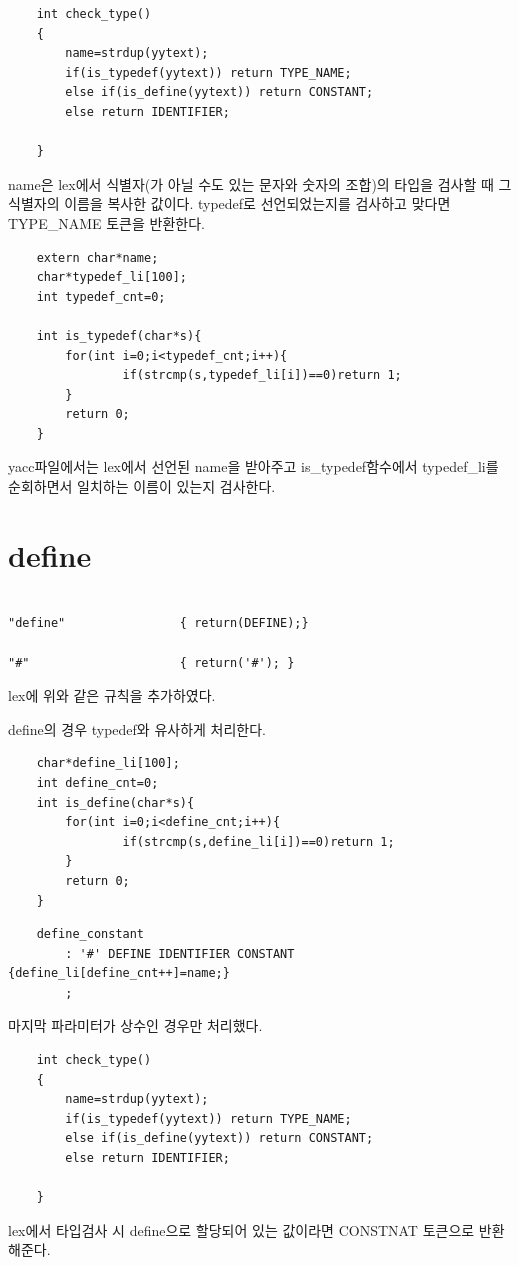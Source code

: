 \documentclass{oblivoir}
\begin{document}
\begin{verbatim}
    int check_type()
    {
        name=strdup(yytext);
        if(is_typedef(yytext)) return TYPE_NAME;
        else if(is_define(yytext)) return CONSTANT;
        else return IDENTIFIER;

    }
\end{verbatim}

name은 lex에서 식별자(가 아닐 수도 있는 문자와 숫자의 조합)의 타입을 검사할 때 그 식별자의 이름을 복사한 값이다.
typedef로 선언되었는지를 검사하고 맞다면 TYPE\_NAME 토큰을 반환한다. 

\begin{verbatim}
    extern char*name;
    char*typedef_li[100];
    int typedef_cnt=0;
    
    int is_typedef(char*s){
        for(int i=0;i<typedef_cnt;i++){
                if(strcmp(s,typedef_li[i])==0)return 1;
        }
        return 0;
    }
\end{verbatim}
yacc파일에서는 lex에서 선언된 name을 받아주고 is\_typedef함수에서 typedef\_li를 순회하면서 일치하는 이름이 있는지 검사한다.

\section{define}
\begin{verbatim}

"define"                { return(DEFINE);}

"#"                     { return('#'); }
\end{verbatim}
lex에 위와 같은 규칙을 추가하였다.

define의 경우 typedef와 유사하게 처리한다.
\begin{verbatim}
    char*define_li[100];
    int define_cnt=0;
    int is_define(char*s){
        for(int i=0;i<define_cnt;i++){
                if(strcmp(s,define_li[i])==0)return 1;
        }
        return 0;
    }
\end{verbatim}
\begin{verbatim}
    define_constant
        : '#' DEFINE IDENTIFIER CONSTANT {define_li[define_cnt++]=name;}
        ;
\end{verbatim}
마지막 파라미터가 상수인 경우만 처리했다.
\begin{verbatim}
    int check_type()
    {
        name=strdup(yytext);
        if(is_typedef(yytext)) return TYPE_NAME;
        else if(is_define(yytext)) return CONSTANT;
        else return IDENTIFIER;

    }
\end{verbatim}
lex에서 타입검사 시 define으로 할당되어 있는 값이라면 CONSTNAT 토큰으로 반환해준다.
\end{document}
